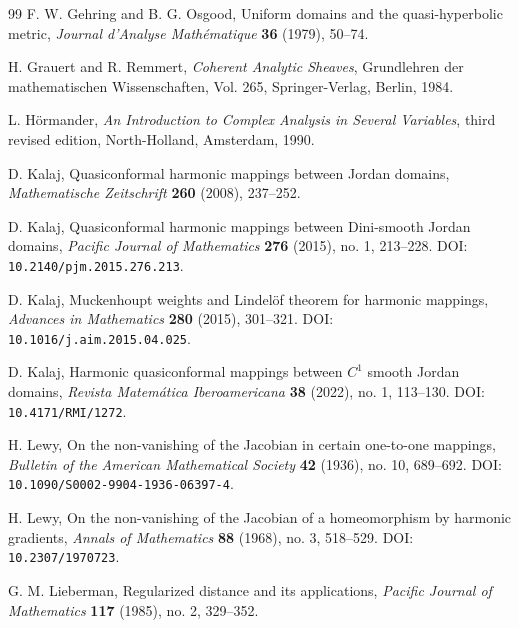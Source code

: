 \documentclass[11pt]{amsart}
\theoremstyle{definition}
\theoremstyle{remark}
\begin{document}
\begin{thebibliography}{99}
F. W. Gehring and B. G. Osgood,
\newblock Uniform domains and the quasi-hyperbolic metric,
\newblock \emph{Journal d'Analyse Math\'ematique} \textbf{36} (1979),
50--74.

H. Grauert and R. Remmert,
\newblock \emph{Coherent Analytic Sheaves},
\newblock Grundlehren der mathematischen Wissenschaften, Vol. 265,
\newblock Springer-Verlag, Berlin, 1984.

L. H\"ormander,
\newblock \emph{An Introduction to Complex Analysis in Several Variables},
\newblock third revised edition,
\newblock North-Holland, Amsterdam, 1990.


D. Kalaj,
\newblock Quasiconformal harmonic mappings between Jordan domains,
\newblock \emph{Mathematische Zeitschrift} \textbf{260} (2008), 237--252.

D. Kalaj,
\newblock Quasiconformal harmonic mappings between Dini-smooth Jordan domains,
\newblock \emph{Pacific Journal of Mathematics} \textbf{276} (2015), no. 1,
213--228.
\newblock DOI: \texttt{10.2140/pjm.2015.276.213}.

D. Kalaj,
\newblock Muckenhoupt weights and Lindel\"of theorem for harmonic mappings,
\newblock \emph{Advances in Mathematics} \textbf{280} (2015), 301--321.
\newblock DOI: \texttt{10.1016/j.aim.2015.04.025}.



D. Kalaj,
\newblock Harmonic quasiconformal mappings between \(C^1\) smooth Jordan domains,
\newblock \emph{Revista Matem\'atica Iberoamericana} \textbf{38} (2022), no. 1,
113--130.
\newblock DOI: \texttt{10.4171/RMI/1272}.

H. Lewy,
\newblock On the non-vanishing of the Jacobian in certain one-to-one mappings,
\newblock \emph{Bulletin of the American Mathematical Society} \textbf{42} (1936), no. 10, 689--692.
\newblock DOI: \texttt{10.1090/S0002-9904-1936-06397-4}.

H. Lewy,
\newblock On the non-vanishing of the Jacobian of a homeomorphism by harmonic gradients,
\newblock \emph{Annals of Mathematics} \textbf{88} (1968), no. 3, 518--529.
\newblock DOI: \texttt{10.2307/1970723}.

G. M. Lieberman,
\newblock Regularized distance and its applications,
\newblock \emph{Pacific Journal of Mathematics} \textbf{117} (1985), no. 2,
329--352.


\end{thebibliography}
\end{document}
